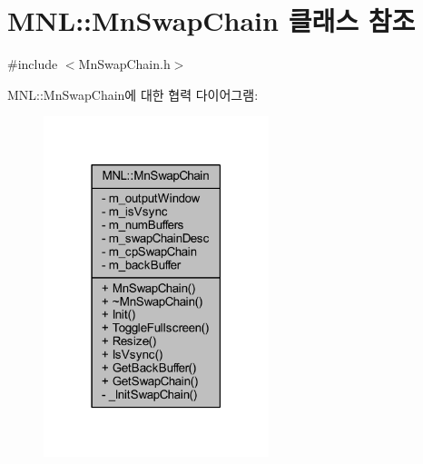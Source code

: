 \hypertarget{class_m_n_l_1_1_mn_swap_chain}{}\section{M\+NL\+:\+:Mn\+Swap\+Chain 클래스 참조}
\label{class_m_n_l_1_1_mn_swap_chain}


{\ttfamily \#include $<$Mn\+Swap\+Chain.\+h$>$}



M\+NL\+:\+:Mn\+Swap\+Chain에 대한 협력 다이어그램\+:\nopagebreak
\begin{figure}[H]
\begin{center}
\leavevmode
\includegraphics[width=186pt]{class_m_n_l_1_1_mn_swap_chain__coll__graph}
\end{center}
\end{figure}
